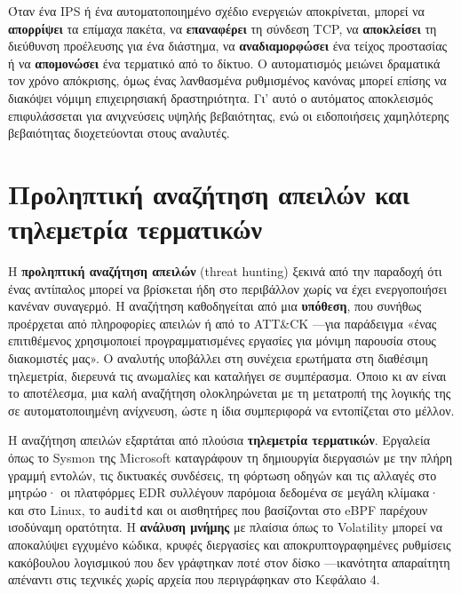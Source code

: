 Όταν ένα IPS ή ένα αυτοματοποιημένο σχέδιο ενεργειών αποκρίνεται, μπορεί να \textbf{απορρίψει} τα επίμαχα πακέτα, να \textbf{επαναφέρει} τη σύνδεση TCP, να \textbf{αποκλείσει} τη διεύθυνση προέλευσης για ένα διάστημα, να \textbf{αναδιαμορφώσει} ένα τείχος προστασίας ή να \textbf{απομονώσει} ένα τερματικό από το δίκτυο. Ο αυτοματισμός μειώνει δραματικά τον χρόνο απόκρισης, όμως ένας λανθασμένα ρυθμισμένος κανόνας μπορεί επίσης να διακόψει νόμιμη επιχειρησιακή δραστηριότητα. Γι' αυτό ο αυτόματος αποκλεισμός επιφυλάσσεται για ανιχνεύσεις υψηλής βεβαιότητας, ενώ οι ειδοποιήσεις χαμηλότερης βεβαιότητας διοχετεύονται στους αναλυτές.

\section{Προληπτική αναζήτηση απειλών και τηλεμετρία τερματικών}\label{sec:11.3}
Η \textbf{προληπτική αναζήτηση απειλών} (threat hunting) ξεκινά από την παραδοχή ότι ένας αντίπαλος μπορεί να βρίσκεται ήδη στο περιβάλλον χωρίς να έχει ενεργοποιήσει κανέναν συναγερμό. Η αναζήτηση καθοδηγείται από μια \textbf{υπόθεση}, που συνήθως προέρχεται από πληροφορίες απειλών ή από το ATT\&CK —για παράδειγμα «ένας επιτιθέμενος χρησιμοποιεί προγραμματισμένες εργασίες για μόνιμη παρουσία στους διακομιστές μας». Ο αναλυτής υποβάλλει στη συνέχεια ερωτήματα στη διαθέσιμη τηλεμετρία, διερευνά τις ανωμαλίες και καταλήγει σε συμπέρασμα. Όποιο κι αν είναι το αποτέλεσμα, μια καλή αναζήτηση ολοκληρώνεται με τη μετατροπή της λογικής της σε αυτοματοποιημένη ανίχνευση, ώστε η ίδια συμπεριφορά να εντοπίζεται στο μέλλον.

Η αναζήτηση απειλών εξαρτάται από πλούσια \textbf{τηλεμετρία τερματικών}. Εργαλεία όπως το Sysmon της Microsoft καταγράφουν τη δημιουργία διεργασιών με την πλήρη γραμμή εντολών, τις δικτυακές συνδέσεις, τη φόρτωση οδηγών και τις αλλαγές στο μητρώο· οι πλατφόρμες EDR συλλέγουν παρόμοια δεδομένα σε μεγάλη κλίμακα· και στο Linux, το \texttt{auditd} και οι αισθητήρες που βασίζονται στο eBPF παρέχουν ισοδύναμη ορατότητα. Η \textbf{ανάλυση μνήμης} με πλαίσια όπως το Volatility μπορεί να αποκαλύψει εγχυμένο κώδικα, κρυφές διεργασίες και αποκρυπτογραφημένες ρυθμίσεις κακόβουλου λογισμικού που δεν γράφτηκαν ποτέ στον δίσκο —ικανότητα απαραίτητη απέναντι στις τεχνικές χωρίς αρχεία που περιγράφηκαν στο Κεφάλαιο 4.

